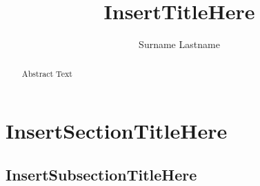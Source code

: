 


	\title{InsertTitleHere}
	\author{Surname Lastname}
	
\begin{abstract}
Abstract Text
\end{abstract}

%
%


%
%

\maketitle
\newpage

\tableofcontents
\listoffigures
\newpage

\renewcommand{\shortauthors}{Lastname, Surname}
\newpage

\section{InsertSectionTitleHere}
\subsection{InsertSubsectionTitleHere}



\newpage
\setcounter{biburllcpenalty}{7000}
\setcounter{biburlucpenalty}{8000}
\printbibliography[title={Bibliography},heading=bibintoc]


